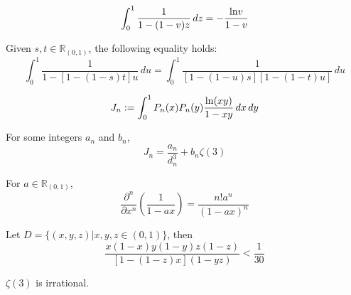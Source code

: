\begin{lemma}\label{one_var_substitution}
    \[ \int_{0}^{1} \frac{1}{1 - (1 - v)z} \, dz= -\frac{{\rm ln}v}{1 - v} \]
\end{lemma}

\begin{lemma}\label{two_var_substitution}
    Given $s, t \in \mathbb{R}_{(0,1)}$, the following equality holds:
    \[ \int_{0}^{1} \frac{1}{1 - [1 - (1 - s)t]u} \, du = \int_{0}^{1} \frac{1}{[1 - (1 - u)s][1 - (1 - t)u]} \, du \]
\end{lemma}

\begin{definition}\label{J_n}
    \[ J_n := \int_{0}^{1} P_n(x)P_n(y)\frac{{\rm ln}(xy)}{1-xy} \, dx \, dy \]
\end{definition}

\begin{lemma}\label{J_n_integers_an_bn}
    For some integers $a_n$ and $b_n$,
    \[ J_n = \frac{a_n}{d_n^3} + b_n\zeta(3) \]
\end{lemma}

\begin{lemma}\label{frac_partial_n}
    For $a \in \mathbb{R}_{(0,1)}$,
    \[ \frac{\partial^n}{\partial x^n}(\frac{1}{1-ax}) = \frac{n!a^n}{(1-ax)^n} \]
\end{lemma}

\begin{lemma}\label{bound}
    Let $D = \{(x,y,z)|x,y,z\in (0,1)\}$, then
    \[ \frac{x(1-x)y(1-y)z(1-z)}{[1-(1-z)x](1-yz)} < \frac{1}{30} \]
\end{lemma}

\begin{theorem}\label{zeta_3_irrational}
    $\zeta(3)$ is irrational.
\end{theorem}